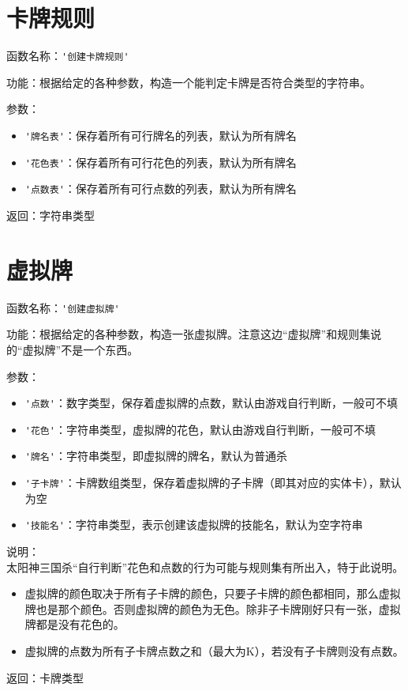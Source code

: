 \section{卡牌规则}

函数名称：\verb|'创建卡牌规则'|

功能：根据给定的各种参数，构造一个能判定卡牌是否符合类型的字符串。

参数：

\begin{itemize}
  \item \verb|'牌名表'|：保存着所有可行牌名的列表，默认为所有牌名
  \item \verb|'花色表'|：保存着所有可行花色的列表，默认为所有牌名
  \item \verb|'点数表'|：保存着所有可行点数的列表，默认为所有牌名
\end{itemize}

返回：字符串类型

\section{虚拟牌}

函数名称：\verb|'创建虚拟牌'|

功能：根据给定的各种参数，构造一张虚拟牌。注意这边“虚拟牌”和规则集说的“虚拟牌”不是一个东西。

参数：

\begin{itemize}
  \item \verb|'点数'|：数字类型，保存着虚拟牌的点数，默认由游戏自行判断，一般可不填
  \item \verb|'花色'|：字符串类型，虚拟牌的花色，默认由游戏自行判断，一般可不填
  \item \verb|'牌名'|：字符串类型，即虚拟牌的牌名，默认为普通杀
  \item \verb|'子卡牌'|：卡牌数组类型，保存着虚拟牌的子卡牌（即其对应的实体卡），默认为空
  \item \verb|'技能名'|：字符串类型，表示创建该虚拟牌的技能名，默认为空字符串
\end{itemize}

说明：\\

太阳神三国杀“自行判断”花色和点数的行为可能与规则集有所出入，特于此说明。

\begin{itemize}
 \item 虚拟牌的颜色取决于所有子卡牌的颜色，只要子卡牌的颜色都相同，那么虚拟牌也是那个颜色。否则虚拟牌的颜色为无色。除非子卡牌刚好只有一张，虚拟牌都是没有花色的。
 \item 虚拟牌的点数为所有子卡牌点数之和（最大为K），若没有子卡牌则没有点数。
\end{itemize}

返回：卡牌类型

